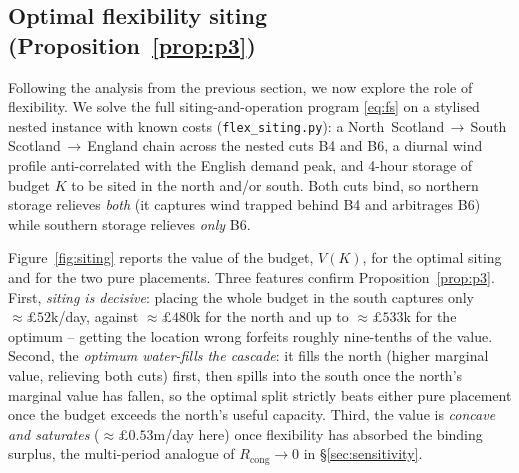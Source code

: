 \documentclass[review,3p,times]{elsarticle}
\theoremstyle{plain}
\theoremstyle{definition}
\begin{document}
\subsection{Optimal flexibility siting (Proposition~\ref{prop:p3})}
\label{sec:siting-num}

Following the analysis from the previous section, we now explore the role of flexibility. We solve the
full siting-and-operation program \eqref{eq:fs} on a stylised nested instance with
known costs (\texttt{flex\_siting.py}): a North~Scotland\,$\to$\,South
Scotland\,$\to$\,England chain across the nested cuts B4 and B6, a diurnal wind
profile anti-correlated with the English demand peak, and 4-hour storage of budget
$K$ to be sited in the north and/or south. Both cuts bind, so northern storage
relieves \emph{both} (it captures wind trapped behind B4 and arbitrages B6) while
southern storage relieves \emph{only} B6.

Figure~\ref{fig:siting} reports the value of the budget, $V(K)$, for the optimal
siting and for the two pure placements. Three features confirm
Proposition~\ref{prop:p3}. First, \emph{siting is decisive}: placing the whole
budget in the south captures only $\approx\pounds52$k/day, against
$\approx\pounds480$k for the north and up to $\approx\pounds533$k for the optimum
 -- getting the location wrong forfeits roughly nine-tenths of the value. Second,
the \emph{optimum water-fills the cascade}: it fills the north (higher marginal
value, relieving both cuts) first, then spills into the south once the north's
marginal value has fallen, so the optimal split strictly beats either pure
placement once the budget exceeds the north's useful capacity. Third, the value is
\emph{concave and saturates} ($\approx\pounds0.53$m/day here) once flexibility has
absorbed the binding surplus, the multi-period analogue of $R_{\mathrm{cong}}\to0$
in \S\ref{sec:sensitivity}.
\end{document}
